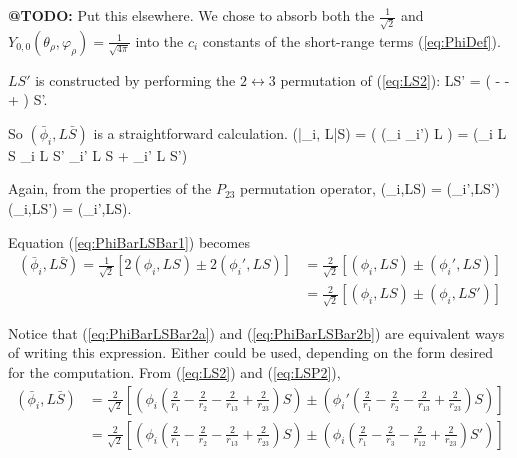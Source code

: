 \documentclass[Dissertation.tex]{subfiles}
\begin{document}
\textbf{@TODO:} Put this elsewhere.
We chose to absorb both the $\frac{1}{\sqrt{2}}$ and $Y_{0,0}(\theta_\rho,\varphi_\rho) = \frac{1}{\sqrt{4\pi}}$ into the $c_i$ constants of the short-range terms (\ref{eq:PhiDef}).

$LS'$ is constructed by performing the $2 \leftrightarrow 3$ permutation of (\ref{eq:LS2}):
\beq
\label{eq:LSP2}
LS' = \left(  -  -  +  \right) S'.
\eeq

So $(\bar{\phi}_i, L\bar{S})$ is a straightforward calculation.
\beq
\label{eq:PhiBarLSBar1}
(\bar{\phi}_i, L\bar{S}) = \left( (\phi_i \pm \phi_i') L \right)
=  \left(\phi_i L S \pm \phi_i L S' \pm \phi_i' L S + \phi_i' L S'\right)
\eeq

Again, from the properties of the $P_{23}$ permutation operator,
\beq
(\phi_i,LS) = (\phi_i',LS')  (\phi_i,LS') = (\phi_i',LS).
\eeq

Equation (\ref{eq:PhiBarLSBar1}) becomes
\begin{subequations}
\label{eq:PhiBarLSBar2}
\begin{align}
(\bar{\phi}_i, L\bar{S}) = \frac{1}{\sqrt{2}} \left[2(\phi_i,LS) \pm 2(\phi_i',LS)\right] &= \frac{2}{\sqrt{2}} \left[(\phi_i,LS) \pm (\phi_i',LS)\right] \label{eq:PhiBarLSBar2a} \\
 &= \frac{2}{\sqrt{2}} \left[(\phi_i,LS) \pm (\phi_i,LS')\right]  \label{eq:PhiBarLSBar2b}
\end{align}
\end{subequations}

Notice that (\ref{eq:PhiBarLSBar2a}) and (\ref{eq:PhiBarLSBar2b}) are equivalent ways of writing this expression.  Either could be used, depending on the form desired for the computation.
From (\ref{eq:LS2}) and (\ref{eq:LSP2}),
\begin{align}
(\bar{\phi}_i, L\bar{S}) &= \frac{2}{\sqrt{2}} \left[\left( \phi_i \left( \frac{2}{r_1} - \frac{2}{r_2} - \frac{2}{r_{13}} + \frac{2}{r_{23}} \right) S\right) \pm \left( \phi_i' \left( \frac{2}{r_1} - \frac{2}{r_2} - \frac{2}{r_{13}} + \frac{2}{r_{23}} \right) S\right)\right] \\
 &= \frac{2}{\sqrt{2}} \left[\left( \phi_i \left( \frac{2}{r_1} - \frac{2}{r_2} - \frac{2}{r_{13}} + \frac{2}{r_{23}} \right) S\right) \pm \left( \phi_i \left( \frac{2}{r_1} - \frac{2}{r_3} - \frac{2}{r_{12}} + \frac{2}{r_{23}} \right) S'\right)\right]
\end{align}
\end{document}
